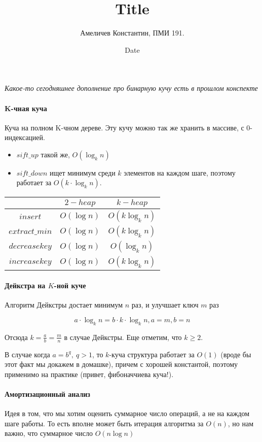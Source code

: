 \documentclass[12pt]{article}
\title{Title}
\author{Амеличев Константин, ПМИ 191.}
\date{Date}
\begin{document}
\textit{Какое-то сегодняшнее дополнение про бинарную кучу есть в прошлом конспекте}
\paragraph{K-чная куча}

Куча на полном K-чном дереве. Эту кучу можно так же хранить в массиве, с 0-индексацией.
\begin{itemize}
    \item $sift\_up$ такой же, $O(\log_k n)$
    \item $sift\_down$ ищет минимум среди $k$ элементов на каждом шаге, поэтому работает за $O(k \cdot \log_k n)$.
\end{itemize}

\begin{tabular}{c|c|c}
 & $2-heap$ & $k-heap$ \\
 \hline
 $insert$ & $O(\log n)$ & $O(k \log_k n)$ \\
 \hline
 $extract\_min$ & $O(\log n)$ & $O(k \log_k n)$ \\
 \hline
 $decrease key$ & $O(\log n)$ & $O(\log_k n)$ \\
 \hline
 $increase key$ & $O(\log n)$ & $O(k \log_k n)$ \\
 \hline
\end{tabular}

\paragraph{Дейкстра на $K$-ной куче}

Алгоритм Дейкстры достает минимум $n$ раз, и улучшает ключ $m$ раз

$$ a \cdot \log_k n = b \cdot k \cdot \log_k n, a = m, b = n$$

Отсюда $k = \frac{a}{b} = \frac{m}{n}$ в случае Дейкстры. Еще отметим, что $k \ge 2$.

В случае когда $a = b^q,\ q > 1$, то $k$-куча структура работает за $O(1)$ (вроде бы этот факт мы докажем в домашке), причем с хорошей константой, поэтому применимо на практике (привет, фибоначчиева куча!).

\paragraph{Амортизационный анализ}

Идея в том, что мы хотим оценить суммарное число операций, а не на каждом шаге работы. То есть вполне может быть итерация алгоритма за $O(n)$, но нам важно, что суммарное число $O(n \log n)$
\end{document}
